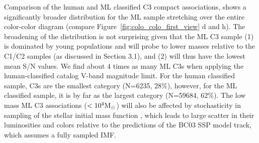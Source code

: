 \documentclass[linenumbers]{aastex63}
\begin{document}
{Comparison of the human and ML classified C3 compact associations, shows a significantly broader distribution for the ML sample stretching over the entire color-color diagram (compare Figure~\ref{fig:colo_colo_first_view} d and h).    The broadening of the distribution is not surprising given that the ML C3 sample (1) is dominated by young populations and will probe to lower masses relative to the C1/C2 samples (as discussed in Section 3.1), and (2) will thus have the lowest mean S/N values.   We find about 4 times as many ML C3s when applying the human-classified catalog V-band magnitude limit. For the human classified sample, C3s are the smallest category (N=6235, 28\%), however, for the ML classified sample, it is by far as the largest category (N=59684, 62\%). %
The low mass ML C3 associations (${\rm <10^4 M_{\odot} }$) will also be affected by stochasticity in sampling of the stellar initial mass function \citep[e.g.][]{fouesneau_accounting_2010,popescu_age_2012,de_meulenaer_deriving_2013,krumholz_star_2015, OD2022}, which leads to large scatter in their luminosities and colors relative to the predictions of the BC03 SSP model track, which assumes a fully sampled IMF.

}
\end{document}
